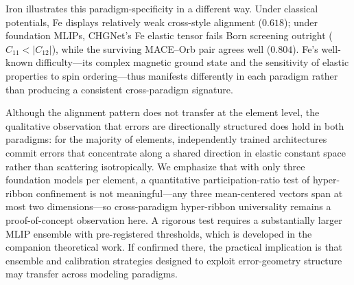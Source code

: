 Iron illustrates this paradigm-specificity in a different way. Under classical potentials, Fe displays relatively weak cross-style alignment ($0.618$); under foundation MLIPs, CHGNet's Fe elastic tensor fails Born screening outright ($C_{11}<|C_{12}|$), while the surviving MACE--Orb pair agrees well ($0.804$). Fe's well-known difficulty---its complex magnetic ground state and the sensitivity of elastic properties to spin ordering---thus manifests differently in each paradigm rather than producing a consistent cross-paradigm signature.

Although the alignment pattern does not transfer at the element level, the qualitative observation that errors are directionally structured does hold in both paradigms: for the majority of elements, independently trained architectures commit errors that concentrate along a shared direction in elastic constant space rather than scattering isotropically. We emphasize that with only three foundation models per element, a quantitative participation-ratio test of hyper-ribbon confinement is not meaningful---any three mean-centered vectors span at most two dimensions---so cross-paradigm hyper-ribbon universality remains a proof-of-concept observation here. A rigorous test requires a substantially larger MLIP ensemble with pre-registered thresholds, which is developed in the companion theoretical work\cite{welcing2026universality}. If confirmed there, the practical implication is that ensemble and calibration strategies designed to exploit error-geometry structure may transfer across modeling paradigms.
